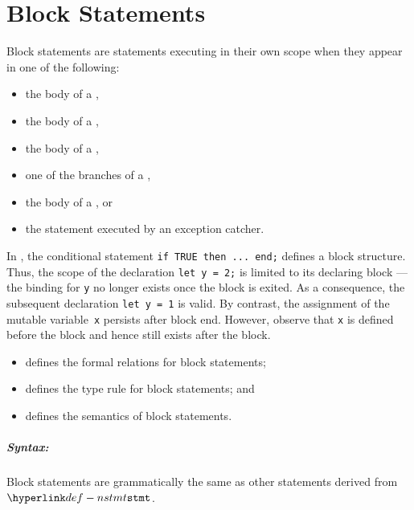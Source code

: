\chapter{Block Statements\label{chap:BlockStatements}}
Block statements are statements executing in their own scope when they appear
in one of the following:
\begin{itemize}
  \item the body of a \whilestatementterm,
  \item the body of a \repeatstatementsterm,
  \item the body of a \forstatementterm,
  \item one of the branches of a \conditionalstatementterm,
  \item the body of a \trystatementterm, or
  \item the statement executed by an exception catcher.
\end{itemize}

In ,
the conditional statement \verb|if TRUE then ... end;| defines a
block structure. Thus, the scope of the declaration \texttt{let y = 2;} is
limited to its declaring block --- the binding for \texttt{y} no longer exists
once the block is exited. As a consequence, the subsequent declaration
\texttt{let y = 1} is valid.  By contrast, the assignment of the mutable
variable~\texttt{x} persists after block end. However, observe that \texttt{x}
is defined before the block and hence still exists after the block.

\ChapterOutline
\begin{itemize}
  \item {} defines the formal relations for block statements;
  \item {} defines the type rule for block statements; and
  \item {} defines the semantics of block statements.
\end{itemize}

\paragraph{Syntax:} Block statements are grammatically the same as other statements
derived from $\Nstmt$.

